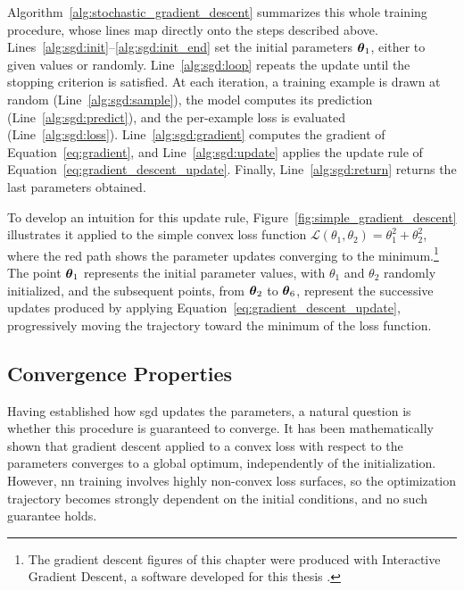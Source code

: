 Algorithm~\ref{alg:stochastic_gradient_descent} summarizes this whole training procedure, whose lines map directly onto the steps described above.
Lines~\ref{alg:sgd:init}--\ref{alg:sgd:init_end} set the initial parameters $\boldsymbol{\theta}_{1}$, either to given values or randomly.
Line~\ref{alg:sgd:loop} repeats the update until the stopping criterion is satisfied.
At each iteration, a training example is drawn at random (Line~\ref{alg:sgd:sample}), the model computes its prediction (Line~\ref{alg:sgd:predict}), and the per-example loss is evaluated (Line~\ref{alg:sgd:loss}).
Line~\ref{alg:sgd:gradient} computes the gradient of Equation~\eqref{eq:gradient}, and Line~\ref{alg:sgd:update} applies the update rule of Equation~\eqref{eq:gradient_descent_update}.
Finally, Line~\ref{alg:sgd:return} returns the last parameters obtained.



To develop an intuition for this update rule, Figure~\ref{fig:simple_gradient_descent} illustrates it applied to the simple convex loss function $\mathcal{L}(\theta_1,\theta_2)=\theta_1^2+\theta_2^2$, where the red path shows the parameter updates converging to the minimum.\footnote{The gradient descent figures of this chapter were produced with Interactive Gradient Descent, a software developed for this thesis \LinkInteractiveGradientDescent.}
The point $\boldsymbol{\theta}_{1}$ represents the initial parameter values, with $\theta_1$ and $\theta_2$ randomly initialized, and the subsequent points, from $\boldsymbol{\theta}_{2}$ to $\boldsymbol{\theta}_{6}$, represent the successive updates produced by applying Equation~\eqref{eq:gradient_descent_update}, progressively moving the trajectory toward the minimum of the loss function.


\subsection{Convergence Properties}

Having established how \gls{sgd} updates the parameters, a natural question is whether this procedure is guaranteed to converge.
It has been mathematically shown that gradient descent applied to a convex loss with respect to the parameters converges to a global optimum, independently of the initialization.
However, \gls{nn} training involves highly non-convex loss surfaces, so the optimization trajectory becomes strongly dependent on the initial conditions, and no such guarantee holds.

